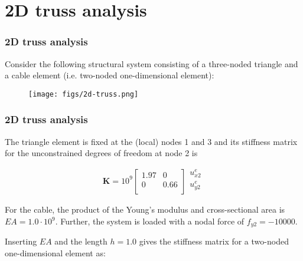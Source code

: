 \documentclass[notes]{beamer}
\begin{document}
\section{2D truss analysis}
\begin{frame}
\frametitle{2D truss analysis}
Consider the following structural system consisting of a three-noded triangle and a cable
element (i.e. two-noded one-dimensional element):

\begin{figure}
	\centering
	\texttt{[image: figs/2d-truss.png]}
\end{figure}
\end{frame}


\begin{frame}
\frametitle{2D truss analysis}

The triangle element is fixed at the (local) nodes 1 and 3 and its stiffness matrix for the
unconstrained degrees of freedom at node 2 is

\begin{equation*}
\mathbf{K} = 10^9 %
\begin{bmatrix}
1.97	& 0 \\ 
0 & 0.66 \\
\end{bmatrix}
%
\begin{matrix}
u_{x2}^e\\ 
u_{y2}^e \\
\end{matrix}	
\end{equation*}

For the cable, the product of the Young’s modulus and cross-sectional area is $EA = 1.0\cdot 10^9$.
Further, the system is loaded with a nodal force of $f_{y2} = -10000$.

Inserting $EA$ and the length $h = 1.0$ gives the stiffness matrix for a two-noded one-dimensional element as:
\end{frame}
\end{document}
